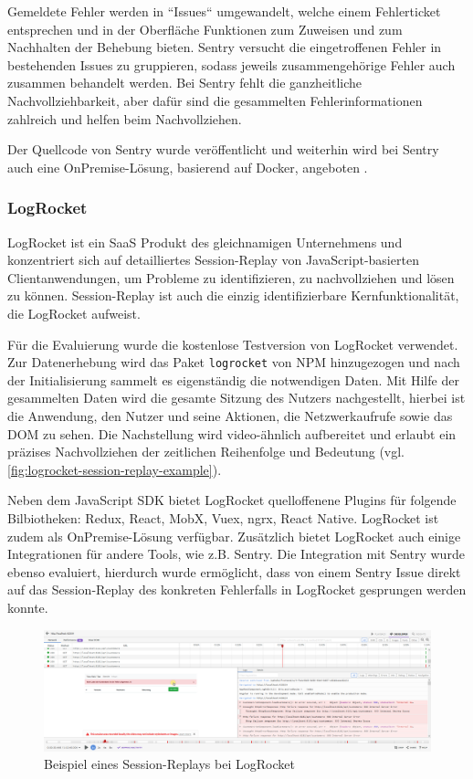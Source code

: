 Gemeldete Fehler werden in ``Issues`` umgewandelt, welche einem Fehlerticket entsprechen und in der Oberfläche Funktionen zum Zuweisen und zum Nachhalten der Behebung bieten. Sentry versucht die eingetroffenen Fehler in bestehenden Issues zu gruppieren, sodass jeweils zusammengehörige Fehler auch zusammen behandelt werden. Bei Sentry fehlt die ganzheitliche Nachvollziehbarkeit, aber dafür sind die gesammelten Fehlerinformationen zahlreich und helfen beim Nachvollziehen.

Der Quellcode von Sentry wurde veröffentlicht und weiterhin wird bei Sentry auch eine OnPremise-Lösung, basierend auf Docker, angeboten \cite{SentrySelfHosted}.

\subsubsection{LogRocket}

LogRocket \cite{LogRocket} ist ein SaaS Produkt des gleichnamigen Unternehmens und konzentriert sich auf detailliertes Session-Replay von JavaScript-basierten Clientanwendungen, um Probleme zu identifizieren, zu nachvollziehen und lösen zu können. Session-Replay ist auch die einzig identifizierbare Kernfunktionalität, die LogRocket aufweist.

Für die Evaluierung wurde die kostenlose Testversion von LogRocket verwendet. Zur Datenerhebung wird das Paket \texttt{logrocket} von NPM hinzugezogen und nach der Initialisierung sammelt es eigenständig die notwendigen Daten. Mit Hilfe der gesammelten Daten wird die gesamte Sitzung des Nutzers nachgestellt, hierbei ist die Anwendung, den Nutzer und seine Aktionen, die Netzwerkaufrufe sowie das DOM zu sehen. Die Nachstellung wird video-ähnlich aufbereitet und erlaubt ein präzises Nachvollziehen der zeitlichen Reihenfolge und Bedeutung (vgl. \autoref{fig:logrocket-session-replay-example}).

Neben dem JavaScript SDK bietet LogRocket quelloffenene Plugins für folgende Bilbiotheken: Redux, React, MobX, Vuex, ngrx, React Native. LogRocket ist zudem als OnPremise-Lösung verfügbar. Zusätzlich bietet LogRocket auch einige Integrationen für andere Tools, wie z.B. Sentry. Die Integration mit Sentry wurde ebenso evaluiert, hierdurch wurde ermöglicht, dass von einem Sentry Issue direkt auf das Session-Replay des konkreten Fehlerfalls in LogRocket gesprungen werden konnte.

\begin{figure}[H]
	\centering
	\includegraphics[width=\linewidth]{img/03_methoden/logrocket_session-replay-example.png}
	\caption{Beispiel eines Session-Replays bei LogRocket}
	\label{fig:logrocket-session-replay-example}
\end{figure}


